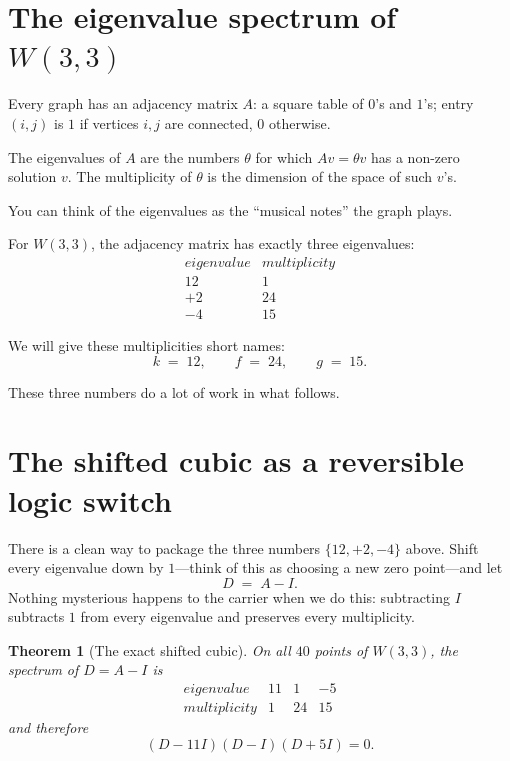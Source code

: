 \documentclass[11pt]{article}
\def\textbf#1{#1}%
\def\text#1{#1}%
\newtheorem*{theorem}{Theorem}
\newcommand{\W}{W(3,3)}
\begin{document}
\section{\texorpdfstring{The eigenvalue spectrum of $W(3,3)$}{The eigenvalue spectrum of W(3,3)}}

\begin{mathnote}
Every graph has an \textbf{adjacency matrix} $A$: a square table of $0$'s and $1$'s; entry $(i,j)$ is $1$ if vertices $i,j$ are connected, $0$ otherwise.

The \textbf{eigenvalues} of $A$ are the numbers $\theta$ for which $A v = \theta v$ has a non-zero solution $v$. The \textbf{multiplicity} of $\theta$ is the dimension of the space of such $v$'s.

You can think of the eigenvalues as the ``musical notes'' the graph plays.
\end{mathnote}

For $\W$, the adjacency matrix has exactly three eigenvalues:
\[
\boxed{
\;\begin{array}{c|c}
\text{eigenvalue} & \text{multiplicity} \\
\hline
12 & 1 \\
+2 & 24 \\
-4 & 15
\end{array}\;}
\]

We will give these multiplicities short names:
\[
k \;=\; 12, \qquad f \;=\; 24, \qquad g \;=\; 15.
\]

These three numbers do a lot of work in what follows.

\section{The shifted cubic as a reversible logic switch}
\label{sec:master-cubic}

There is a clean way to package the three numbers
$\{12,+2,-4\}$ above.  Shift every eigenvalue down by $1$---think of this
as choosing a new zero point---and let
\[
D \;=\; A - I.
\]
Nothing mysterious happens to the carrier when we do this: subtracting
$I$ subtracts $1$ from every eigenvalue and preserves every multiplicity.

\begin{theorem}[The exact shifted cubic]\label{thm:master-cubic}
On all $40$ points of $W(3,3)$, the spectrum of $D=A-I$ is
\[
\boxed{
\begin{array}{c|ccc}
\text{eigenvalue} & 11 & 1 & -5\\
\hline
\text{multiplicity} & 1 & 24 & 15
\end{array}}
\]
and therefore
\[
\boxed{(D-11I)(D-I)(D+5I)=0.}
\]
\end{theorem}
\end{document}
